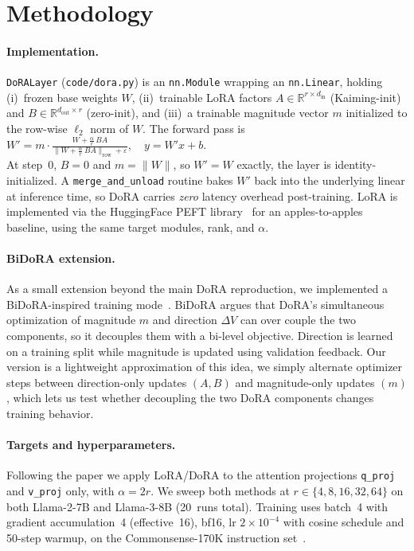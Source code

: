 \documentclass[11pt,twocolumn]{article}
\begin{document}
\section{Methodology}
\vspace{-1em}
\paragraph{Implementation.}
\texttt{DoRALayer} (\texttt{code/dora.py}) is an \texttt{nn.Module}
wrapping an \texttt{nn.Linear}, holding (i)~frozen base weights $W$,
(ii)~trainable LoRA factors $A\in\mathbb{R}^{r\times d_{\text{in}}}$
(Kaiming-init) and $B\in\mathbb{R}^{d_{\text{out}}\times r}$
(zero-init), and (iii)~a trainable magnitude vector $m$ initialized to
the row-wise $\ell_2$ norm of $W$. The forward pass is\\
$W' = m \cdot \frac{W + \tfrac{\alpha}{r}\,BA}{\bigl\|W + \tfrac{\alpha}{r}\,BA\bigr\|_{\text{row}} + \varepsilon},\quad y = W'x + b.$\\
At step~0, $B{=}0$ and $m{=}\|W\|$, so $W'{=}W$ exactly, the layer is
identity-initialized. A \texttt{merge\_and\_unload} routine bakes $W'$
back into the underlying linear at inference time, so DoRA carries
\emph{zero} latency overhead post-training. LoRA is implemented via the
HuggingFace PEFT library~\cite{peft} for an apples-to-apples baseline,
using the same target modules, rank, and $\alpha$.
\vspace{-1em}
\paragraph{BiDoRA extension.}
As a small extension beyond the main DoRA reproduction, we implemented a BiDoRA-inspired training mode~\cite{qin2024bidora}. BiDoRA argues that DoRA's simultaneous optimization of magnitude $m$ and direction $\Delta V$ can over couple the two components, so it decouples them with a bi-level objective. Direction is learned on a training split while magnitude is updated using validation feedback. Our version is a lightweight approximation of this idea, we simply alternate optimizer steps between direction-only updates $(A,B)$ and magnitude-only updates $(m)$, which lets us test whether decoupling the two DoRA components changes training behavior.
\vspace{-1em}
\paragraph{Targets and hyperparameters.}
Following the paper we apply LoRA/DoRA to the attention projections
\texttt{q\_proj} and \texttt{v\_proj} only, with $\alpha=2r$. We sweep
both methods at $r\in\{4,8,16,32,64\}$ on both Llama-2-7B and Llama-3-8B
(20~runs total). Training uses batch~4 with gradient accumulation~4
(effective~16), bf16, lr $2{\times}10^{-4}$ with cosine schedule and
50-step warmup, on the Commonsense-170K instruction
set~\cite{hu2023llmadapters}.
\vspace{-1em}
\end{document}
